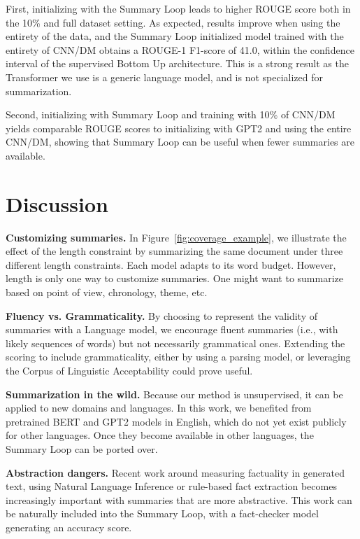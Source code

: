 \documentclass[11pt,a4paper]{article}
\begin{document}
First, initializing with the Summary Loop leads to higher ROUGE score both in the 10\% and full dataset setting. As expected, results improve when using the entirety of the data, and the Summary Loop initialized model trained with the entirety of CNN/DM obtains a ROUGE-1 F1-score of 41.0, within the confidence interval of the supervised Bottom Up \cite{gehrmann2018bottom} architecture. This is a strong result as the Transformer we use is a generic language model, and is not specialized for summarization.

Second, initializing with Summary Loop and training with 10\% of CNN/DM yields comparable ROUGE scores to initializing with GPT2 and using the entire CNN/DM, showing that Summary Loop can be useful when fewer summaries are available.

\section{Discussion}

\textbf{Customizing summaries.} In Figure~\ref{fig:coverage_example}, we illustrate the effect of the length constraint by summarizing the same document under three different length constraints. Each model adapts to its word budget. However, length is only one way to customize summaries. One might want to summarize based on point of view, chronology, theme, etc.

\textbf{Fluency vs. Grammaticality.} By choosing to represent the validity of summaries with a Language model, we encourage fluent summaries (i.e., with likely sequences of words) but not necessarily grammatical ones. Extending the scoring to include grammaticality, either by using a parsing model, or leveraging the Corpus of Linguistic Acceptability \cite{warstadt2019neural} could prove useful.

\textbf{Summarization in the wild.} Because our method is unsupervised, it can be applied to new domains and languages. In this work, we benefited from pretrained BERT and GPT2 models in English, which do not yet exist publicly for other languages. Once they become available in other languages, the Summary Loop can be ported over.

\textbf{Abstraction dangers.}  Recent work around measuring factuality in generated text, using Natural Language Inference \cite{guo2018soft} or rule-based fact extraction \cite{zhang2019optimizing} becomes increasingly important with summaries that are more abstractive. This work can be naturally included into the Summary Loop, with a fact-checker model generating an accuracy score.
\end{document}

